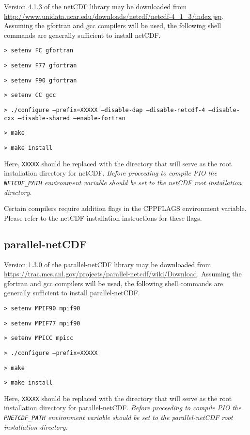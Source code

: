 Version 4.1.3 of the netCDF library may be downloaded from \url{http://www.unidata.ucar.edu/downloads/netcdf/netcdf-4\_1\_3/index.jsp}.
Assuming the gfortran and gcc compilers will be used, the following shell commands are generally sufficient to install netCDF.

\vspace{12pt}
{\tt > setenv FC gfortran}

{\tt > setenv F77 gfortran} 

{\tt > setenv F90 gfortran}

{\tt > setenv CC gcc} 

{\tt > ./configure --prefix=XXXXX --disable-dap --disable-netcdf-4 --disable-cxx \hfill\break --disable-shared --enable-fortran} 

{\tt > make}

{\tt > make install}
\vspace{12pt}

Here, {\tt XXXXX} should be replaced with the directory that will serve as the root installation directory for netCDF.
{\em Before proceeding to compile PIO the {\tt NETCDF\_PATH} environment variable should be set to the netCDF root installation directory.}

Certain compilers require addition flags in the CPPFLAGS environment variable. Please refer to the netCDF installation instructions for these flags.

\subsection{parallel-netCDF}

Version 1.3.0 of the parallel-netCDF library may be downloaded from \url{https://trac.mcs.anl.gov/projects/parallel-netcdf/wiki/Download}.
Assuming the gfortran and gcc compilers will be used, the following shell commands are generally sufficient to install parallel-netCDF.

\vspace{12pt}
{\tt > setenv MPIF90 mpif90}

{\tt > setenv MPIF77 mpif90} 

{\tt > setenv MPICC mpicc}  

{\tt > ./configure --prefix=XXXXX} 

{\tt > make}

{\tt > make install}
\vspace{12pt}

Here, {\tt XXXXX} should be replaced with the directory that will serve as the root installation directory for parallel-netCDF.
{\em Before proceeding to compile PIO the {\tt PNETCDF\_PATH} environment variable should be set to the parallel-netCDF root installation directory.}


